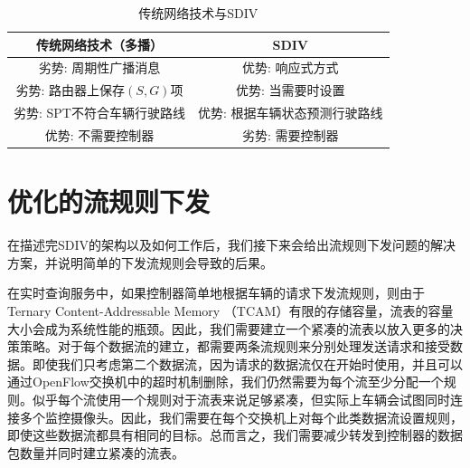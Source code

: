 \begin{table}[t]
 \centering
 \begin{tabular}{c|c}
  \hline
  传统网络技术（多播） & SDIV \\
  \hline
  \hline
  劣势: 周期性广播消息 & 优势: 响应式方式 \\
 \hline
 劣势: 路由器上保存$(S,G)$项& 优势: 当需要时设置 \\
 \hline
 劣势: SPT不符合车辆行驶路线 & 优势: 根据车辆状态预测行驶路线\\
  \hline
  优势: 不需要控制器 & 劣势: 需要控制器 \\
  \hline
 \end{tabular}
 \caption{\label{table1}传统网络技术与SDIV}
\end{table}

\section{优化的流规则下发}

在描述完SDIV的架构以及如何工作后，我们接下来会给出流规则下发问题的解决方案，并说明简单的下发流规则会导致的后果。


在实时查询服务中，如果控制器简单地根据车辆的请求下发流规则，则由于Ternary Content-Addressable Memory （TCAM）有限的存储容量，流表的容量大小会成为系统性能的瓶颈。因此，我们需要建立一个紧凑的流表以放入更多的决策策略。对于每个数据流的建立，都需要两条流规则来分别处理发送请求和接受数据。即使我们只考虑第二个数据流，因为请求的数据流仅在开始时使用，并且可以通过OpenFlow交换机中的超时机制删除，我们仍然需要为每个流至少分配一个规则。似乎每个流使用一个规则对于流表来说足够紧凑，但实际上车辆会试图同时连接多个监控摄像头。因此，我们需要在每个交换机上对每个此类数据流设置规则，即使这些数据流都具有相同的目标。总而言之，我们需要减少转发到控制器的数据包数量并同时建立紧凑的流表。

